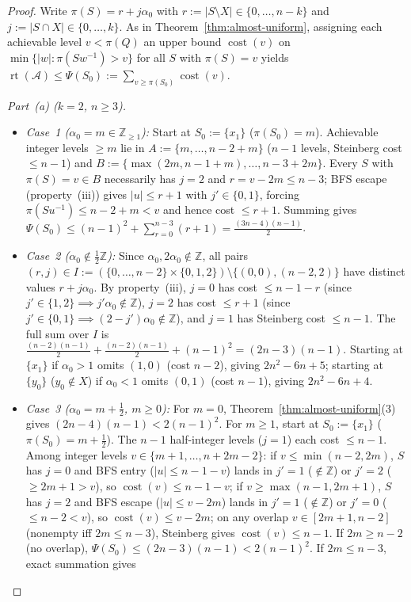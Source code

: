 \documentclass[11pt,a4paper]{article}
\theoremstyle{definition}
\theoremstyle{remark}
\newcommand{\rt}{\operatorname{rt}}
\newcommand{\Z}{\mathbb{Z}}
\newcommand{\cA}{\mathcal{A}}
\begin{document}
\begin{proof}
Write $\pi(S) = r + j \alpha_0$ with $r := |S \setminus X| \in \{0, \dots, n - k\}$ and $j := |S \cap X| \in \{0, \dots, k\}$. As in Theorem~\ref{thm:almost-uniform}, assigning each achievable level $v < \pi(Q)$ an upper bound $\operatorname{cost}(v)$ on $\min\{|w| : \pi(S w^{-1}) > v\}$ for all $S$ with $\pi(S) = v$ yields $\rt(\cA) \le \Psi(S_0) := \sum_{v \ge \pi(S_0)} \operatorname{cost}(v)$.

\emph{Part~(a) ($k = 2$, $n \ge 3$).}
\begin{itemize}[nosep]
  \item \emph{Case~1 ($\alpha_0 = m \in \Z_{\ge 1}$):} Start at $S_0 := \{x_1\}$ ($\pi(S_0) = m$). Achievable integer levels $\ge m$ lie in $A := \{m, \dots, n - 2 + m\}$ ($n - 1$ levels, Steinberg cost $\le n - 1$) and $B := \{\max(2m, n - 1 + m), \dots, n - 3 + 2m\}$. Every $S$ with $\pi(S) = v \in B$ necessarily has $j = 2$ and $r = v - 2m \le n - 3$; BFS escape (property~(iii)) gives $|u| \le r + 1$ with $j' \in \{0, 1\}$, forcing $\pi(S u^{-1}) \le n - 2 + m < v$ and hence cost $\le r + 1$. Summing gives $\Psi(S_0) \le (n-1)^2 + \sum_{r=0}^{n-3}(r+1) = \frac{(3n-4)(n-1)}{2}$.
  \item \emph{Case~2 ($\alpha_0 \notin \frac{1}{2}\Z$):} Since $\alpha_0, 2\alpha_0 \notin \Z$, all pairs $(r, j) \in I := (\{0,\dots,n-2\} \times \{0,1,2\}) \setminus \{(0,0),(n-2,2)\}$ have distinct values $r + j\alpha_0$. By property~(iii), $j = 0$ has cost $\le n - 1 - r$ (since $j' \in \{1, 2\} \implies j'\alpha_0 \notin \Z$), $j = 2$ has cost $\le r + 1$ (since $j' \in \{0, 1\} \implies (2-j')\alpha_0 \notin \Z$), and $j = 1$ has Steinberg cost $\le n - 1$. The full sum over $I$ is $\frac{(n-2)(n-1)}{2} + \frac{(n-2)(n-1)}{2} + (n-1)^2 = (2n-3)(n-1)$. Starting at $\{x_1\}$ if $\alpha_0 > 1$ omits $(1,0)$ (cost $n-2$), giving $2n^2 - 6n + 5$; starting at $\{y_0\}$ ($y_0 \notin X$) if $\alpha_0 < 1$ omits $(0,1)$ (cost $n-1$), giving $2n^2 - 6n + 4$.
  \item \emph{Case~3 ($\alpha_0 = m + \frac{1}{2}$, $m \ge 0$):} For $m = 0$, Theorem~\ref{thm:almost-uniform}(3) gives $(2n-4)(n-1) < 2(n-1)^2$. For $m \ge 1$, start at $S_0 := \{x_1\}$ ($\pi(S_0) = m + \frac{1}{2}$). The $n - 1$ half-integer levels ($j = 1$) each cost $\le n - 1$. Among integer levels $v \in \{m+1, \dots, n+2m-2\}$: if $v \le \min(n-2, 2m)$, $S$ has $j = 0$ and BFS entry ($|u| \le n - 1 - v$) lands in $j' = 1$ ($\notin \Z$) or $j' = 2$ ($\ge 2m+1 > v$), so $\operatorname{cost}(v) \le n - 1 - v$; if $v \ge \max(n-1, 2m+1)$, $S$ has $j = 2$ and BFS escape ($|u| \le v - 2m$) lands in $j' = 1$ ($\notin \Z$) or $j' = 0$ ($\le n-2 < v$), so $\operatorname{cost}(v) \le v - 2m$; on any overlap $v \in [2m+1, n-2]$ (nonempty iff $2m \le n - 3$), Steinberg gives $\operatorname{cost}(v) \le n - 1$. If $2m \ge n - 2$ (no overlap), $\Psi(S_0) \le (2n-3)(n-1) < 2(n-1)^2$. If $2m \le n - 3$, exact summation gives

\end{itemize}
\end{proof}
\end{document}
